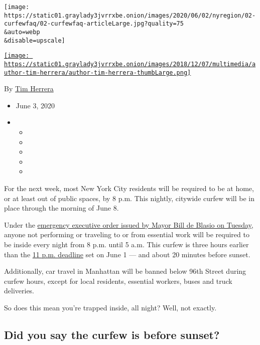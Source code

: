 \texttt{[image: https://static01.graylady3jvrrxbe.onion/images/2020/06/02/nyregion/02-curfewfaq/02-curfewfaq-articleLarge.jpg?quality=75\\\&auto=webp\\\&disable=upscale]}

\href{https://www.nytimes3xbfgragh.onion/by/tim-herrera}{\texttt{[image: https://static01.graylady3jvrrxbe.onion/images/2018/12/07/multimedia/author-tim-herrera/author-tim-herrera-thumbLarge.png]}}

By \href{https://www.nytimes3xbfgragh.onion/by/tim-herrera}{Tim Herrera}

\begin{itemize}
\item
  June 3, 2020
\item
  \begin{itemize}
  \item
  \item
  \item
  \item
  \item
  \end{itemize}
\end{itemize}

For the next week, most New York City residents will be required to be
at home, or at least out of public spaces, by 8 p.m. This nightly,
citywide curfew will be in place through the morning of June 8.

Under the
\href{https://www1.nyc.gov/assets/home/downloads/pdf/executive-orders/2020/eeo-119.pdf}{emergency
executive order issued by Mayor Bill de Blasio on Tuesday}, anyone not
performing or traveling to or from essential work will be required to be
inside every night from 8 p.m. until 5 a.m. This curfew is three hours
earlier than the
\href{https://www1.nyc.gov/assets/home/downloads/pdf/executive-orders/2020/eeo-117.pdf}{11
p.m. deadline} set on June 1 --- and about 20 minutes before sunset.

Additionally, car travel in Manhattan will be banned below 96th Street
during curfew hours, except for local residents, essential workers,
buses and truck deliveries.

So does this mean you're trapped inside, all night? Well, not exactly.

\hypertarget{did-you-say-the-curfew-is-before-sunset}{%
\subsection{Did you say the curfew is before
sunset?}\label{did-you-say-the-curfew-is-before-sunset}}

